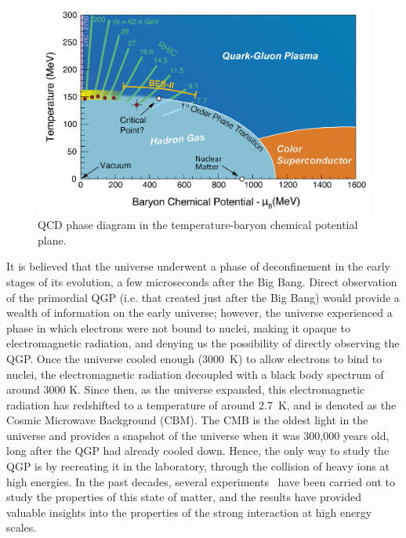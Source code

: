 \begin{figure}
  \centering
  \includegraphics[width=0.7\linewidth]{Figures/Chapter 1/QCD-diagram.jpg}
  \caption{QCD phase diagram in the temperature-baryon chemical potential plane.}
  \label{fig:PhaseDiagram}
\end{figure}

It is believed that the universe underwent a phase of deconfinement in the early stages of its evolution, a few microseconds after the Big Bang. Direct observation of the primordial QGP (i.e. that created just after the Big Bang) would provide a wealth of information on the early universe; however, the universe experienced a phase in which electrons were not bound to nuclei, making it opaque to electromagnetic radiation, and denying us the possibility of directly observing the QGP. Once the universe cooled enough (3000~K) to allow electrons to bind to nuclei, the electromagnetic radiation decoupled with a black body spectrum of around 3000 K. Since then, as the universe expanded, this electromagnetic radiation has redshifted to a temperature of around 2.7~K, and is denoted as the Cosmic Microwave Background (CBM). The CMB is the oldest light in the universe and provides a snapshot of the universe when it was 300,000 years old, long after the QGP had already cooled down. Hence, the only way to study the QGP is by recreating it in the laboratory, through the collision of heavy ions at high energies. In the past decades, several experiments~\cite{ALICE:2022wpn, NA38:2000wlp, NA50:1997hlx, Nouicer:2009fy} have been carried out to study the properties of this state of matter, and the results have provided valuable insights into the properties of the strong interaction at high energy scales.

